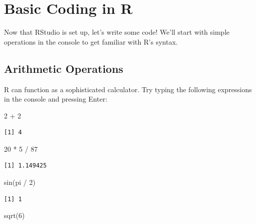\documentclass[
  letterpaper,
  DIV=11,
  numbers=noendperiod]{scrreprt}
\newenvironment{Shaded}{\begin{snugshade}}{\end{snugshade}}
\newcommand{\DecValTok}[1]{\textcolor[rgb]{0.68,0.00,0.00}{#1}}
\newcommand{\FunctionTok}[1]{\textcolor[rgb]{0.28,0.35,0.67}{#1}}
\newcommand{\NormalTok}[1]{\textcolor[rgb]{0.00,0.23,0.31}{#1}}
\newcommand{\SpecialCharTok}[1]{\textcolor[rgb]{0.37,0.37,0.37}{#1}}
\begin{document}
\section{Basic Coding in R}\label{basic-coding-in-r}

Now that RStudio is set up, let's write some code! We'll start with
simple operations in the console to get familiar with R's syntax.

\subsection{Arithmetic Operations}\label{arithmetic-operations}

R can function as a sophisticated calculator. Try typing the following
expressions in the console and pressing Enter:

\begin{Shaded}
\begin{Highlighting}[]
\DecValTok{2} \SpecialCharTok{+} \DecValTok{2}
\end{Highlighting}
\end{Shaded}

\begin{verbatim}
[1] 4
\end{verbatim}

\begin{Shaded}
\begin{Highlighting}[]
\DecValTok{20} \SpecialCharTok{*} \DecValTok{5} \SpecialCharTok{/} \DecValTok{87}
\end{Highlighting}
\end{Shaded}

\begin{verbatim}
[1] 1.149425
\end{verbatim}

\begin{Shaded}
\begin{Highlighting}[]
\FunctionTok{sin}\NormalTok{(pi }\SpecialCharTok{/} \DecValTok{2}\NormalTok{)}
\end{Highlighting}
\end{Shaded}

\begin{verbatim}
[1] 1
\end{verbatim}

\begin{Shaded}
\begin{Highlighting}[]
\FunctionTok{sqrt}\NormalTok{(}\DecValTok{6}\NormalTok{)}
\end{Highlighting}
\end{Shaded}
\end{document}

